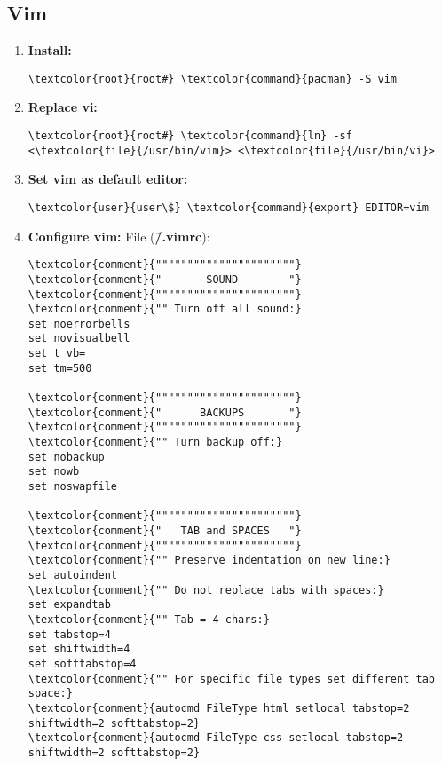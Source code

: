 \documentclass[10pt, a4paper, onecolumn, openany]{book} %
\begin{document}
\subsection{Vim}
\begin{enumerate}
    \item \textbf{Install:}
\begin{Verbatim}[commandchars=\\\{\}]
\textcolor{root}{root#} \textcolor{command}{pacman} -S vim
\end{Verbatim}
    \item \textbf{Replace vi:}
\begin{Verbatim}[commandchars=\\\{\}]
\textcolor{root}{root#} \textcolor{command}{ln} -sf <\textcolor{file}{/usr/bin/vim}> <\textcolor{file}{/usr/bin/vi}>
\end{Verbatim}
    \item \textbf{Set vim as default editor:}
\begin{Verbatim}[commandchars=\\\{\}]
\textcolor{user}{user\$} \textcolor{command}{export} EDITOR=vim
\end{Verbatim}
    \item \textbf{Configure vim:}
File (\textbf{\textcolor{file}{\~/.vimrc}}):
\begin{Verbatim}[commandchars=\\\{\}]
\textcolor{comment}{""""""""""""""""""""""}
\textcolor{comment}{"       SOUND        "}
\textcolor{comment}{""""""""""""""""""""""}
\textcolor{comment}{"" Turn off all sound:}
set noerrorbells
set novisualbell
set t_vb=
set tm=500

\textcolor{comment}{""""""""""""""""""""""}
\textcolor{comment}{"      BACKUPS       "}
\textcolor{comment}{""""""""""""""""""""""}
\textcolor{comment}{"" Turn backup off:}
set nobackup
set nowb
set noswapfile

\textcolor{comment}{""""""""""""""""""""""}
\textcolor{comment}{"   TAB and SPACES   "}
\textcolor{comment}{""""""""""""""""""""""}
\textcolor{comment}{"" Preserve indentation on new line:}
set autoindent
\textcolor{comment}{"" Do not replace tabs with spaces:}
set expandtab
\textcolor{comment}{"" Tab = 4 chars:}
set tabstop=4
set shiftwidth=4
set softtabstop=4
\textcolor{comment}{"" For specific file types set different tab space:}
\textcolor{comment}{autocmd FileType html setlocal tabstop=2 shiftwidth=2 softtabstop=2}
\textcolor{comment}{autocmd FileType css setlocal tabstop=2 shiftwidth=2 softtabstop=2}


\end{Verbatim}
\end{enumerate}
\end{document}
